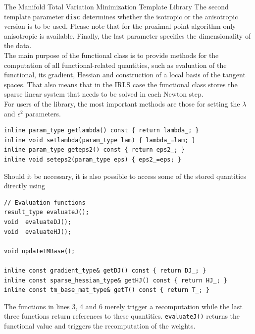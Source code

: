 \begin{chapter}{The Manifold Total Variation Minimization Template Library}
The second template parameter \texttt{disc} determines whether the isotropic or the anisotropic version is to be used. Please note that for the proximal point algorithm only
anisotropic is available. Finally, the last parameter specifies the dimensionality of the data. \\
The main purpose of the functional class is to provide methods for the computation of all functional-related quantities, such as evaluation of the functional, its gradient,
Hessian and construction of a local basis of the tangent spaces. That also means that in the IRLS case the functional class stores the sparse linear system that needs to be solved
in each Newton step.\\

For users of the library, the most important methods are those for setting the $\lambda$ and $\epsilon^2$ parameters.
\cppinline
\begin{lstlisting}
inline param_type getlambda() const { return lambda_; }
inline void setlambda(param_type lam) { lambda_=lam; }
inline param_type geteps2() const { return eps2_; }
inline void seteps2(param_type eps) { eps2_=eps; }
\end{lstlisting}

Should it be necessary, it is also possible to access some of the stored quantities directly using
\cppinline
\begin{lstlisting}
// Evaluation functions
result_type evaluateJ();
void  evaluateDJ();
void  evaluateHJ();
 
void updateTMBase();

inline const gradient_type& getDJ() const { return DJ_; }
inline const sparse_hessian_type& getHJ() const { return HJ_; }
inline const tm_base_mat_type& getT() const { return T_; }
\end{lstlisting}
The functions in lines 3, 4 and 6 merely trigger a recomputation while the last three functions return references to these quantities. \texttt{evaluateJ()} returns the functional value and triggers the 
recomputation of the weights.




\end{chapter}
